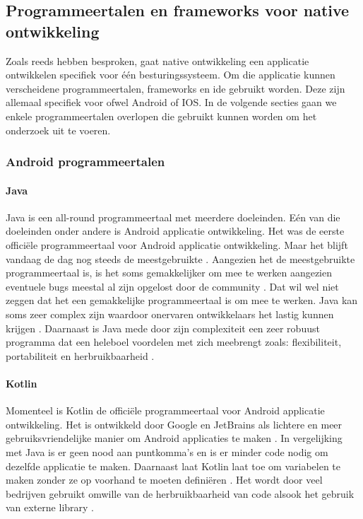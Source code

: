 \subsection{Programmeertalen en frameworks voor native ontwikkeling}
Zoals reeds hebben besproken, gaat native ontwikkeling een applicatie ontwikkelen 
specifiek voor één besturingssysteem. Om die 
applicatie kunnen verscheidene programmeertalen, frameworks 
en \acrshort{ide} gebruikt worden. Deze zijn allemaal specifiek voor ofwel Android of IOS. In de volgende 
secties gaan we enkele programmeertalen overlopen die gebruikt kunnen worden om het onderzoek uit te voeren.

\subsubsection{Android programmeertalen}
\paragraph{Java}
Java is een all-round programmeertaal met meerdere doeleinden. Eén van die doeleinden 
onder andere is Android applicatie ontwikkeling. Het was de eerste officiële programmeertaal 
voor Android applicatie ontwikkeling. Maar het blijft vandaag de dag nog steeds de 
meestgebruikte \autocite{harkiran2022}. Aangezien het de meestgebruikte programmeertaal 
is, is het soms gemakkelijker om mee te werken aangezien eventuele bugs meestal al zijn 
opgelost door de community \autocite{Thorndyke2021}. Dat wil wel niet zeggen dat het een 
gemakkelijke programmeertaal is om mee te werken. Java kan soms zeer complex zijn waardoor 
onervaren ontwikkelaars het lastig kunnen krijgen \autocite{Kesavan2021}. Daarnaast is Java 
mede door zijn complexiteit een zeer robuust programma dat een heleboel voordelen met zich 
meebrengt zoals: flexibiliteit, portabiliteit en herbruikbaarheid \autocite{Kesavan2021}.

\paragraph{Kotlin}
Momenteel is Kotlin de officiële programmeertaal voor Android applicatie ontwikkeling. 
Het is ontwikkeld door Google en \Gls{JetBrains} als lichtere en meer gebruiksvriendelijke
manier om Android applicaties te maken \autocite{Thorndyke2021}. In vergelijking met Java 
is er geen nood aan puntkomma's en is er minder code nodig om dezelfde applicatie te maken. Daarnaast laat Kotlin 
laat toe om variabelen te maken zonder ze op voorhand te moeten definiëren \autocite{Thorndyke2021}. 
Het wordt door veel bedrijven gebruikt omwille van de herbruikbaarheid van code alsook het 
gebruik van externe \gls{library} \autocite{Kesavan2021}.

